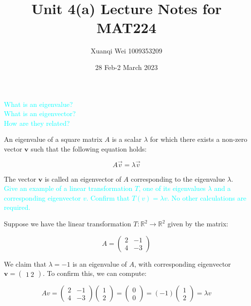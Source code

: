 \documentclass[fontsize=12pt]{scrartcl}
\title{Unit 4(a) Lecture Notes for MAT224}
\author{Xuanqi Wei 1009353209}
\date{28 Feb-2 March 2023}
\begin{document}
\maketitle

\newpage

\noindent
\textcolor{cyan}{What is an eigenvalue?}\\
\textcolor{cyan}{What is an eigenvector?}\\
\textcolor{cyan}{How are they related?}

\noindent
An eigenvalue of a square matrix $A$ is a scalar $\lambda$ for which there exists a non-zero vector $\mathbf{v}$ such that the following equation holds:

$$ A\vec{v} = \lambda\vec{v} $$

\noindent
The vector $\mathbf{v}$ is called an eigenvector of $A$ corresponding to the eigenvalue $\lambda$.
\\

\noindent
\textcolor{cyan}{Give an example of a linear transformation $T$, one of its eigenvalues $\lambda$ and a corresponding eigenvector $v$. Confirm that $T(v) = \lambda v$. No other calculations are required.}

\noindent
Suppose we have the linear transformation $T:\mathbb{R}^2\rightarrow \mathbb{R}^2$ given by the matrix:

$$A = \left(\begin{array}{cc} 2 & -1 \\ 4 & -3 \end{array} \right) $$

\noindent
We claim that $\lambda = -1$ is an eigenvalue of $A$, with corresponding eigenvector $\mathbf{v} = \begin{pmatrix} 1 \ 2 \end{pmatrix}$. To confirm this, we can compute:

$$Av = \left(\begin{array}{cc} 2 & -1 \\ 4 & -3 \end{array} \right)\left(\begin{array}{c} 1 \\ 2 \end{array} \right) = \left(\begin{array}{c} 0 \\ 0 \end{array} \right) = (-1)\left(\begin{array}{c} 1 \\ 2 \end{array} \right) = \lambda v $$
\end{document}
